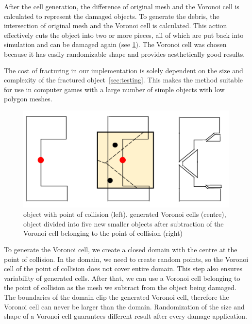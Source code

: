 After the cell generation, the difference of original mesh and the Voronoi cell is calculated to represent the damaged objects. To generate the debris, the intersection of original mesh and the Voronoi cell is calculated. This action effectively cuts the object into two or more pieces, all of which are put back into simulation and can be damaged again (see \cref{fig:subtraction}). The Voronoi cell was chosen because it has easily randomizable shape and provides aesthetically good results.

The cost of fracturing in our implementation is solely dependent on the size and complexity of the fractured object~\cref{sec:testing}. This makes the method suitable for use in computer games with a large number of simple objects with low polygon meshes.

\begin{figure}
        \centering
        \includegraphics[width=\textwidth]{img/subtractionProcess}
        \caption{object with point of collision (left), generated Voronoi cells (centre), object divided into five new smaller objects after subtraction of the Voronoi cell belonging to the point of collision (right)}
        \label{fig:subtraction}
\end{figure}

To generate the Voronoi cell, we create a closed domain with the centre at the point of collision. In the domain, we need to create random points, so the Voronoi cell of the point of collision does not cover entire domain. This step also ensures variability of generated cells. After that, we can use a Voronoi cell belonging to the point of collision as the mesh we subtract from the object being damaged. The boundaries of the domain clip the generated Voronoi cell, therefore the Voronoi cell can never be larger than the domain. Randomization of the size and shape of a Voronoi cell guarantees different result after every damage application.

